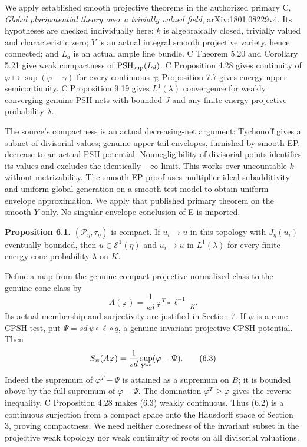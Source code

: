 \documentclass[
  10pt,
]{article}
\begin{document}
We apply established smooth projective theorems in the authorized
primary C, \emph{Global pluripotential theory over a trivially valued
field}, arXiv:1801.08229v4. Its hypotheses are checked individually
here: \(k\) is algebraically closed, trivially valued and characteristic
zero; \(Y\) is an actual integral smooth projective variety, hence
connected; and \(L_d\) is an actual ample line bundle. C Theorem 5.20
and Corollary 5.21 give weak compactness of
\(\mathrm{PSH}_{\rm sup}(L_d)\). C Proposition 4.28 gives continuity of
\(\varphi\mapsto\sup(\varphi-\gamma)\) for every continuous \(\gamma\);
Proposition 7.7 gives energy upper semicontinuity. C Proposition 9.19
gives \(L^1(\lambda)\) convergence for weakly converging genuine PSH
nets with bounded \(J\) and any finite-energy projective probability
\(\lambda\).

The source's compactness is an actual decreasing-net argument: Tychonoff
gives a subnet of divisorial values; genuine upper tail envelopes,
furnished by smooth EP, decrease to an actual PSH potential.
Nonnegligibility of divisorial points identifies its values and excludes
the identically \(-\infty\) limit. This works over uncountable \(k\)
without metrizability. The smooth EP proof uses multiplier-ideal
subadditivity and uniform global generation on a smooth test model to
obtain uniform envelope approximation. We apply that published primary
theorem on the smooth \(Y\) only. No singular envelope conclusion of E
is imported.

\textbf{Proposition 6.1.} \((\mathcal P_\eta,\tau_\eta)\) is compact. If
\(u_i\to u\) in this topology with \(J_\eta(u_i)\) eventually bounded,
then \(u\in\mathcal E^1(\eta)\) and \(u_i\to u\) in \(L^1(\lambda)\) for
every finite-energy cone probability \(\lambda\) on \(K\).

Define a map from the genuine compact projective normalized class to the
genuine cone class by \[
A(\varphi)=\frac1{sd}\,\varphi^T\circ\ell^{-1}\big|_K.                  \tag{6.2}
\] Its actual membership and surjectivity are justified in Section 7. If
\(\psi\) is a cone CPSH test, put \(\Psi=sd\,\psi\circ\ell\circ q\), a
genuine invariant projective CPSH potential. Then \[
S_\psi(A\varphi)=\frac1{sd}\sup_{Y^{\rm an}}(\varphi-\Psi).             \tag{6.3}
\] Indeed the supremum of \(\varphi^T-\Psi\) is attained as a supremum
on \(B\); it is bounded above by the full supremum of \(\varphi-\Psi\).
The domination \(\varphi^T\ge\varphi\) gives the reverse inequality. C
Proposition 4.28 makes (6.3) weakly continuous. Thus (6.2) is a
continuous surjection from a compact space onto the Hausdorff space of
Section 3, proving compactness. We need neither closedness of the
invariant subset in the projective weak topology nor weak continuity of
roots on all divisorial valuations.
\end{document}
